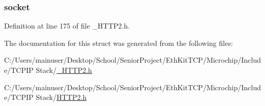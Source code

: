 \subsubsection[{socket}]{ socket}\label{struct_h_t_t_p___s_t_u_b_a16977cce566f5643908528edfb9c395a}


Definition at line 175 of file \+\_\+\+H\+T\+T\+P2.\+h.



The documentation for this struct was generated from the following files\+:\begin{DoxyCompactItemize}
\item 
C\+:/\+Users/mainuser/\+Desktop/\+School/\+Senior\+Project/\+Eth\+Kit\+T\+C\+P/\+Microchip/\+Include/\+T\+C\+P\+I\+P Stack/\hyperlink{___h_t_t_p2_8h}{\+\_\+\+H\+T\+T\+P2.\+h}\item 
C\+:/\+Users/mainuser/\+Desktop/\+School/\+Senior\+Project/\+Eth\+Kit\+T\+C\+P/\+Microchip/\+Include/\+T\+C\+P\+I\+P Stack/\hyperlink{_h_t_t_p2_8h}{H\+T\+T\+P2.\+h}\end{DoxyCompactItemize}
